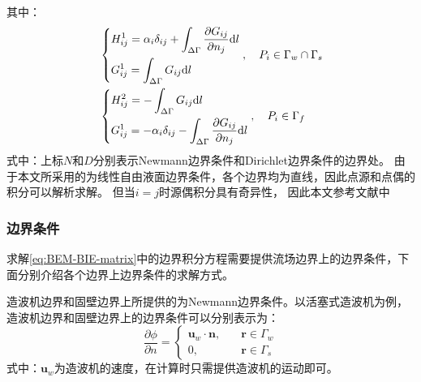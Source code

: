 其中：
\begin{subequations}
  \begin{align}
    & \left\{
      \begin{aligned}
        & H_{ij}^1 = \alpha_i \delta_{ij} + \int_{\Delta\Gamma} \frac{\partial G_{ij}}{\partial n_j} {\rm{d}} l \\
        & G_{ij}^1 = \int_{\Delta\Gamma} G_{ij} {\rm{d}} l
      \end{aligned}
    \right.
    , \quad P_i \in \Gamma_w \cap \Gamma_s \\
    & \left\{
      \begin{aligned}
        & H_{ij}^2 = - \int_{\Delta\Gamma} G_{ij} {\rm{d}} l \\
        & G_{ij}^1 = - \alpha_i \delta_{ij} - \int_{\Delta\Gamma} \frac{\partial G_{ij}}{\partial n_j} {\rm{d}} l
      \end{aligned}
    \right.
    , \quad P_i \in \Gamma_f
  \end{align}
\end{subequations}
式中：上标$N$和$D$分别表示Newmann边界条件和Dirichlet边界条件的边界处。%
由于本文所采用的为线性自由液面边界条件，各个边界均为直线，因此点源和点偶的积分可以解析求解。%
但当$i = j$时源偶积分具有奇异性，%
因此本文参考文献\parencite{ZangYueLongGuanYuBianJieYuanFaZhongQiYiJiFenDeChuLi1994}中%

\subsubsection{
  \texorpdfstring{边界条件} %
  {\thesubsubsection 边界条件} %
}
\label{sssec:BEM-边界条件}

求解\cref{eq:BEM-BIE-matrix}中的边界积分方程需要提供流场边界上的边界条件，下面分别介绍各个边界上边界条件的求解方式。

造波机边界和固壁边界上所提供的为Newmann边界条件。以活塞式造波机为例，造波机边界和固壁边界上的边界条件可以分别表示为：
\begin{equation}
  \frac{\partial\phi}{\partial n} = 
  \left\{
    \begin{aligned}
      \bm{u}_w \cdot \bm{n}, \quad & \bm{r} \in \Gamma_w \\
      0, \quad & \bm{r} \in \Gamma_s
    \end{aligned}
  \right.
  \label{eq:BEM-WBC}
\end{equation}
式中：$\bm{u}_w$为造波机的速度，在计算时只需提供造波机的运动即可。

